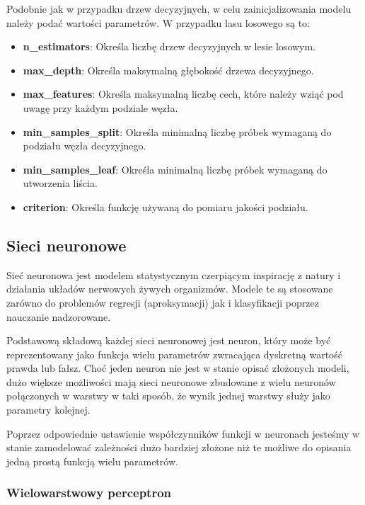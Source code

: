 \documentclass{article}
\begin{document}
Podobnie jak w przypadku drzew decyzyjnych, w celu
zainicjalizowania modelu należy podać wartości
parametrów. W przypadku lasu losowego są to:

\begin{itemize}
    \item \textbf{n\_estimators}: Określa liczbę drzew decyzyjnych
    w lesie losowym.
    \item \textbf{max\_depth}: Określa maksymalną głębokość drzewa
    decyzyjnego.
    \item \textbf{max\_features}: Określa maksymalną liczbę cech,
    które należy wziąć pod uwagę przy każdym podziale węzła.
    \item \textbf{min\_samples\_split}: Określa minimalną liczbę
    próbek wymaganą do podziału węzła decyzyjnego.
    \item \textbf{min\_samples\_leaf}: Określa minimalną liczbę
    próbek wymaganą do utworzenia liścia.
    \item \textbf{criterion}: Określa funkcję używaną do pomiaru
    jakości podziału.
\end{itemize}


\subsection{Sieci neuronowe}
Sieć neuronowa jest modelem statystycznym czerpiącym inspirację z natury i 
działania układów nerwowych żywych organizmów.
Modele te są stosowane zarówno do problemów regresji (aproksymacji) jak i klasyfikacji 
poprzez nauczanie nadzorowane.

Podstawową składową każdej sieci neuronowej jest neuron, który może być reprezentowany 
jako funkcja wielu parametrów zwracająca dyskretną wartość
prawda lub fałsz. Choć jeden neuron nie jest w stanie opisać złożonych modeli, 
dużo większe możliwości mają sieci neuronowe zbudowane z wielu neuronów
połączonych w warstwy w taki sposób, że wynik jednej warstwy służy jako parametry kolejnej.


Poprzez odpowiednie ustawienie współczynników funkcji w neuronach jesteśmy w 
stanie zamodelować zależności dużo bardziej złożone niż te możliwe do opisania jedną
prostą funkcją wielu parametrów.

\subsubsection{Wielowarstwowy perceptron}
\end{document}
